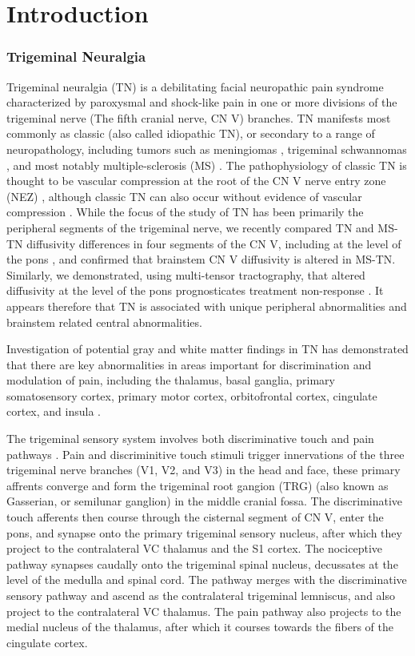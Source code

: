 \section{Introduction}
\subsubsection{Trigeminal Neuralgia}
Trigeminal neuralgia (TN) is a debilitating facial neuropathic pain syndrome characterized by paroxysmal and shock-like pain in one or more divisions of the trigeminal nerve (The fifth cranial nerve, CN V) branches. TN manifests most commonly as classic (also called idiopathic TN), or secondary to a range of neuropathology, including tumors such as meningiomas \cite{Cheng2008}, trigeminal schwannomas \cite{Miller2008}, and most notably multiple-sclerosis (MS) \cite{Cruccu2009,VanderMeijs2002,Nick2012}. The pathophysiology of classic TN is thought to be vascular compression at the root of the CN V nerve entry zone (NEZ) \cite{Linn2011,Love2001}, although classic TN can also occur without evidence of vascular compression \cite{Lee2014}. While the focus of the study of TN has been primarily the peripheral segments of the trigeminal nerve, we recently compared TN and MS-TN diffusivity differences in four segments of the CN V, including at the level of the pons \cite{Chen2016a}, and confirmed that brainstem CN V diffusivity is altered in MS-TN. Similarly, we demonstrated, using multi-tensor tractography, that altered diffusivity at the level of the pons prognosticates treatment non-response \cite{Hung2017}. It appears therefore that TN is associated with unique peripheral abnormalities and brainstem related central abnormalities. 

Investigation of potential gray and white matter findings in TN has demonstrated that there are key abnormalities in areas important for discrimination and modulation of pain, including the thalamus, basal ganglia, primary somatosensory cortex, primary motor cortex, orbitofrontal cortex, cingulate cortex, and insula \cite{Desouza2013c, Desouza2013}.

The trigeminal sensory system involves both discriminative touch and pain pathways \cite{Henssen2016}.  Pain and discriminitive touch stimuli trigger innervations of the three trigeminal nerve branches (V1, V2, and V3) in the head and face, these primary affrents converge and form the trigeminal root gangion (TRG) (also known as Gasserian, or semilunar ganglion) in the middle cranial fossa. The discriminative touch afferents then course through the cisternal segment of CN V, enter the pons, and synapse onto the primary trigeminal sensory nucleus, after which they project to the contralateral VC thalamus and the S1 cortex. The nociceptive pathway synapses caudally onto the trigeminal spinal nucleus, decussates at the level of the medulla and spinal cord. The pathway merges with the discriminative sensory pathway and ascend as the contralateral trigeminal lemniscus, and also project to the contralateral VC thalamus. The pain pathway also projects to the medial nucleus of the thalamus, after which it courses towards the fibers of the cingulate cortex. 

